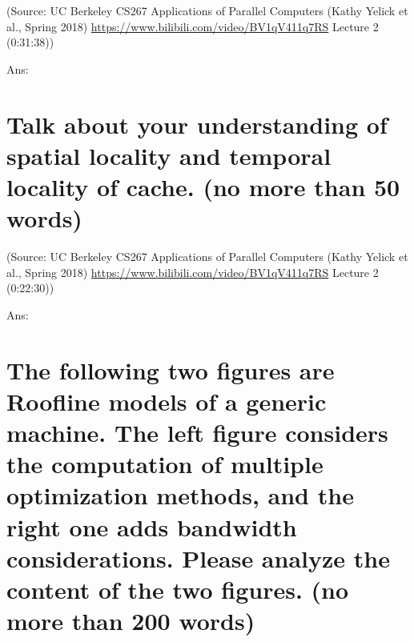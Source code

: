 \documentclass{article}
\begin{document}
(Source: UC Berkeley CS267 Applications of Parallel Computers (Kathy Yelick et al., Spring 2018) \url{https://www.bilibili.com/video/BV1qV411q7RS} Lecture 2 (0:31:38))

Ans:%
~\\
\section{Talk about your understanding of spatial locality and temporal locality of cache. (no more than 50 words)}
(Source: UC Berkeley CS267 Applications of Parallel Computers (Kathy Yelick et al., Spring 2018) \url{https://www.bilibili.com/video/BV1qV411q7RS} Lecture 2 (0:22:30))

Ans:%
~\\
\section{The following two figures are Roofline models of a generic machine. The left figure considers the computation of multiple optimization methods, and the right one adds bandwidth considerations. Please analyze the content of the two figures. (no more than 200 words)}

\begin{figure}[htbp]
\centering
{}
\end{figure}
\end{document}
